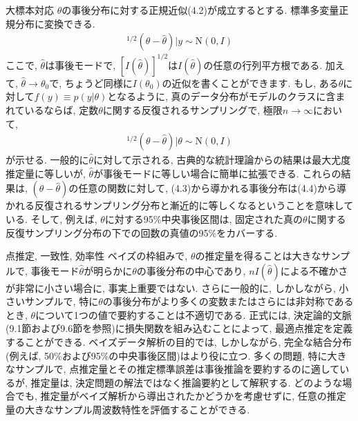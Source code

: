 \documentclass[10pt,dvipdfmx,a4]{beamer}
\newcommand{\eq}[1]{\begin{align}#1\end{align}}
\begin{document}

\begin{frame}{大標本対応}
$\theta$の事後分布に対する正規近似(4.2)が成立するとする.
標準多変量正規分布に変換できる.
\eq{[I(\hat{\theta})]^{1/2}(\theta-\hat{\theta})|y\sim \text{N}(0,I)}
ここで, $\hat{\theta}$は事後モードで, $[I(\hat{\theta})]^{1/2}$は$I(\hat{\theta})$の任意の行列平方根である.
加えて, $\hat{\theta}\rightarrow \theta_0$で, ちょうど同様に$I(\theta_0)$の近似を書くことができます.
もし, ある$\theta$に対して$f(y)\equiv p(y|\theta)$となるように, 真のデータ分布がモデルのクラスに含まれているならば,  定数$\theta$に関する反復されるサンプリングで, 極限$n\rightarrow \infty$において, 
\eq{[I(\hat{\theta})]^{1/2}(\theta-\hat{\theta})|\theta\sim\text{N}(0,I)}
が示せる.
一般的に$\hat{\theta}$に対して示される, 古典的な統計理論からの結果は最大尤度推定量に等しいが, $\hat{\theta}$が事後モードに等しい場合に簡単に拡張できる.
これらの結果は, $(\theta-\hat{\theta})$の任意の関数に対して, (4.3)から導かれる事後分布は(4.4)から導かれる反復されるサンプリング分布と漸近的に等しくなるということを意味している.
そして, 例えば, $\theta$に対する95\%中央事後区間は, 固定された真の$\theta$に関する反復サンプリング分布の下での回数の真値の95\%をカバーする.
\end{frame}


\begin{frame}{点推定, 一致性, 効率性}
ベイズの枠組みで, $\theta$の推定量を得ることは大きなサンプルで, 事後モード$\hat{\theta}$が明らかに$\theta$の事後分布の中心であり, $nI(\hat{\theta})$による不確かさが非常に小さい場合に, 事実上重要ではない.
さらに一般的に, しかしながら, 小さいサンプルで, 特に$\theta$の事後分布がより多くの変数またはさらには非対称であるとき, $\theta$について1つの値で要約することは不適切である.
正式には, 決定論的文脈(9.1節および9.6節を参照)に損失関数を組み込むことによって, 最適点推定を定義することができる.
ベイズデータ解析の目的では, しかしながら, 完全な結合分布(例えば, 50\%および95\%の中央事後区間)はより役に立つ.
多くの問題, 特に大きなサンプルで, 点推定量とその推定標準誤差は事後推論を要約するのに適しているが, 推定量は, 決定問題の解法ではなく推論要約として解釈する.
どのような場合でも, 推定量がベイズ解析から導出されたかどうかを考慮せずに, 任意の推定量の大きなサンプル周波数特性を評価することができる.
\end{frame}

\end{document}
